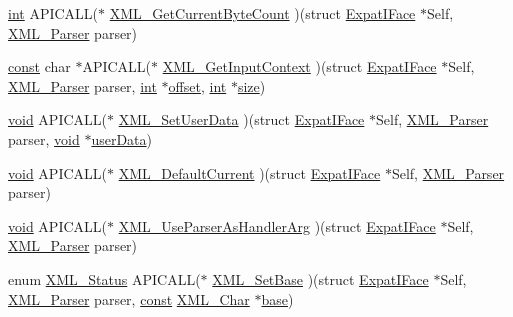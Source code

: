 \begin{DoxyCompactItemize}
\item 
\hyperlink{xmltok_8h_a5a0d4a5641ce434f1d23533f2b2e6653}{int} A\+P\+I\+C\+A\+LL($\ast$ \hyperlink{struct_expat_i_face_af4d0c8bc345694497e373deb3dc3f3cd}{X\+M\+L\+\_\+\+Get\+Current\+Byte\+Count} )(struct \hyperlink{struct_expat_i_face}{Expat\+I\+Face} $\ast$Self, \hyperlink{amiga_2include_2libraries_2expat_8h_a9dc0003156857c67b3a60b3993846013}{X\+M\+L\+\_\+\+Parser} parser)
\item 
\hyperlink{getopt1_8c_a2c212835823e3c54a8ab6d95c652660e}{const} char $\ast$A\+P\+I\+C\+A\+LL($\ast$ \hyperlink{struct_expat_i_face_a86eb12fae888996bde1a003f3c8a4469}{X\+M\+L\+\_\+\+Get\+Input\+Context} )(struct \hyperlink{struct_expat_i_face}{Expat\+I\+Face} $\ast$Self, \hyperlink{amiga_2include_2libraries_2expat_8h_a9dc0003156857c67b3a60b3993846013}{X\+M\+L\+\_\+\+Parser} parser, \hyperlink{xmltok_8h_a5a0d4a5641ce434f1d23533f2b2e6653}{int} $\ast$\hyperlink{layer12_8c_a33d71f23ba2052d17f0b754dc35265b0}{offset}, \hyperlink{xmltok_8h_a5a0d4a5641ce434f1d23533f2b2e6653}{int} $\ast$\hyperlink{group__lavu__mem_ga854352f53b148adc24983a58a1866d66}{size})
\item 
\hyperlink{sound_8c_ae35f5844602719cf66324f4de2a658b3}{void} A\+P\+I\+C\+A\+LL($\ast$ \hyperlink{struct_expat_i_face_a4bfa8ae639dafc6c3fb781e2d2475eca}{X\+M\+L\+\_\+\+Set\+User\+Data} )(struct \hyperlink{struct_expat_i_face}{Expat\+I\+Face} $\ast$Self, \hyperlink{amiga_2include_2libraries_2expat_8h_a9dc0003156857c67b3a60b3993846013}{X\+M\+L\+\_\+\+Parser} parser, \hyperlink{sound_8c_ae35f5844602719cf66324f4de2a658b3}{void} $\ast$\hyperlink{xmlparse_8c_a4b666535c828e23ccd16510a0a1a1943}{user\+Data})
\item 
\hyperlink{sound_8c_ae35f5844602719cf66324f4de2a658b3}{void} A\+P\+I\+C\+A\+LL($\ast$ \hyperlink{struct_expat_i_face_a0be31c9a487fe69c4c448cb88ab8db6c}{X\+M\+L\+\_\+\+Default\+Current} )(struct \hyperlink{struct_expat_i_face}{Expat\+I\+Face} $\ast$Self, \hyperlink{amiga_2include_2libraries_2expat_8h_a9dc0003156857c67b3a60b3993846013}{X\+M\+L\+\_\+\+Parser} parser)
\item 
\hyperlink{sound_8c_ae35f5844602719cf66324f4de2a658b3}{void} A\+P\+I\+C\+A\+LL($\ast$ \hyperlink{struct_expat_i_face_a7221d53ff72a90d46ae221b1b741b944}{X\+M\+L\+\_\+\+Use\+Parser\+As\+Handler\+Arg} )(struct \hyperlink{struct_expat_i_face}{Expat\+I\+Face} $\ast$Self, \hyperlink{amiga_2include_2libraries_2expat_8h_a9dc0003156857c67b3a60b3993846013}{X\+M\+L\+\_\+\+Parser} parser)
\item 
enum \hyperlink{amiga_2include_2libraries_2expat_8h_aef71ca3ac8198499d56aaa7b474303bb}{X\+M\+L\+\_\+\+Status} A\+P\+I\+C\+A\+LL($\ast$ \hyperlink{struct_expat_i_face_aff42e500f98ddfd2137942062e80af50}{X\+M\+L\+\_\+\+Set\+Base} )(struct \hyperlink{struct_expat_i_face}{Expat\+I\+Face} $\ast$Self, \hyperlink{amiga_2include_2libraries_2expat_8h_a9dc0003156857c67b3a60b3993846013}{X\+M\+L\+\_\+\+Parser} parser, \hyperlink{getopt1_8c_a2c212835823e3c54a8ab6d95c652660e}{const} \hyperlink{amiga_2include_2libraries_2expat_8h_a63da96463e775e1ec3a7d1f076208127}{X\+M\+L\+\_\+\+Char} $\ast$\hyperlink{lib_2expat_8h_a938e186c531ea86ae9adf3c0a649d8fc}{base})

\end{DoxyCompactItemize}
